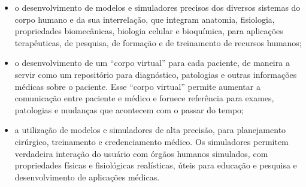 \begin{itemize}
\begin{itemize}
			\item o desenvolvimento de modelos e simuladores
				precisos dos diversos sistemas do corpo
				humano e da sua interrelação, que
				integram anatomia, fisiologia,
				propriedades biomecânicas, biologia
				celular e bioquímica, para aplicações
				terapêuticas, de pesquisa, de formação e
				de treinamento de recursos humanos;

			\item o desenvolvimento de um “corpo virtual”
				para cada paciente, de maneira a servir
				como um repositório para diagnóstico,
				patologias e outras informações médicas
				sobre o paciente.  Esse “corpo virtual”
				permite aumentar a comunicação entre
				paciente e médico e fornece referência
				para exames, patologias e mudanças que
				acontecem com o passar do tempo;

			\item a utilização de modelos e simuladores de
				alta precisão, para planejamento
				cirúrgico, treinamento e credenciamento
				médico. Os simuladores permitem
				verdadeira interação do usuário com
				órgãos humanos simulados, com
				propriedades físicas e fisiológicas
				realísticas, úteis para educação e
				pesquisa e desenvolvimento de aplicações
				médicas.
		\end{itemize}
\end{itemize}
